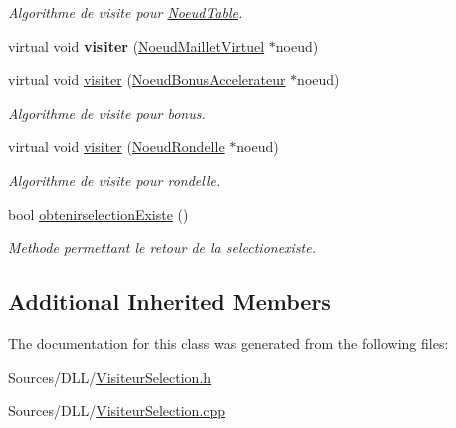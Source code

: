 \begin{DoxyCompactItemize}
\begin{DoxyCompactList}\small\item\em Algorithme de visite pour \hyperlink{class_noeud_table}{Noeud\+Table}. \end{DoxyCompactList}\item 
virtual void {\bfseries visiter} (\hyperlink{class_noeud_maillet_virtuel}{Noeud\+Maillet\+Virtuel} $\ast$noeud)
\item 
virtual void \hyperlink{group__inf2990_gaa00c8b4c2a981faf4b6bd5ecdafc3427}{visiter} (\hyperlink{class_noeud_bonus_accelerateur}{Noeud\+Bonus\+Accelerateur} $\ast$noeud)
\begin{DoxyCompactList}\small\item\em Algorithme de visite pour bonus. \end{DoxyCompactList}\item 
virtual void \hyperlink{group__inf2990_ga81f3ec46afbfe7fdbc5a3406991e00b7}{visiter} (\hyperlink{class_noeud_rondelle}{Noeud\+Rondelle} $\ast$noeud)
\begin{DoxyCompactList}\small\item\em Algorithme de visite pour rondelle. \end{DoxyCompactList}\item 
\hypertarget{class_visiteur_selection_aa2882688ed42325b7ecf6b17be4fcc72}{}\label{class_visiteur_selection_aa2882688ed42325b7ecf6b17be4fcc72} 
bool \hyperlink{class_visiteur_selection_aa2882688ed42325b7ecf6b17be4fcc72}{obtenirselection\+Existe} ()
\begin{DoxyCompactList}\small\item\em Methode permettant le retour de la selectionexiste. \end{DoxyCompactList}\end{DoxyCompactItemize}
\subsection*{Additional Inherited Members}


The documentation for this class was generated from the following files\+:\begin{DoxyCompactItemize}
\item 
Sources/\+D\+L\+L/\hyperlink{_visiteur_selection_8h}{Visiteur\+Selection.\+h}\item 
Sources/\+D\+L\+L/\hyperlink{_visiteur_selection_8cpp}{Visiteur\+Selection.\+cpp}\end{DoxyCompactItemize}
